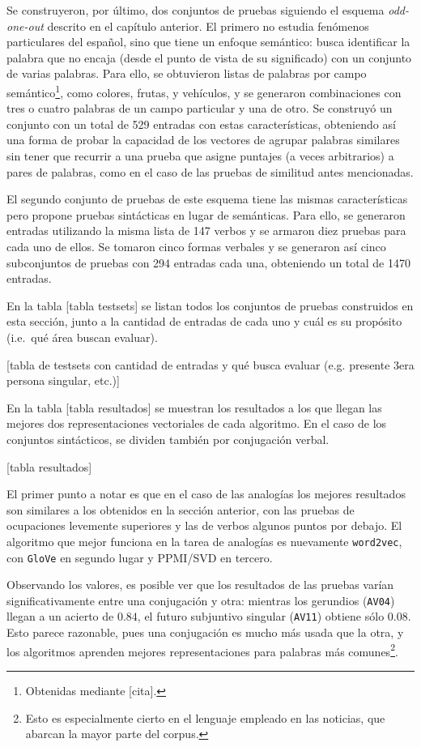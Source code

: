 Se construyeron, por último, dos conjuntos de pruebas siguiendo el esquema \textit{odd-one-out}
descrito en el capítulo anterior. El primero no estudia fenómenos particulares del español, sino que
tiene un enfoque semántico: busca identificar la palabra que no encaja (desde el punto de vista de
su significado) con un conjunto de varias palabras. Para ello, se obtuvieron listas de palabras por
campo semántico\footnote{Obtenidas mediante [cita].}, como colores, frutas, y vehículos, y se
generaron combinaciones con tres o cuatro palabras de un campo particular y una de otro. Se
construyó un conjunto con un total de 529 entradas con estas características, obteniendo así una
forma de probar la capacidad de los vectores de agrupar palabras similares sin tener que recurrir a
una prueba que asigne puntajes (a veces arbitrarios) a pares de palabras, como en el caso de las
pruebas de similitud antes mencionadas.

El segundo conjunto de pruebas de este esquema tiene las mismas características pero propone pruebas
sintácticas en lugar de semánticas. Para ello, se generaron entradas utilizando la misma lista de
147 verbos y se armaron diez pruebas para cada uno de ellos. Se tomaron cinco formas verbales y se
generaron así cinco subconjuntos de pruebas con 294 entradas cada una, obteniendo un total de 1470
entradas.

En la tabla [tabla testsets] se listan todos los conjuntos de pruebas construidos en esta sección,
junto a la cantidad de entradas de cada uno y cuál es su propósito (i.e.\ qué área buscan evaluar).

[tabla de testsets con cantidad de entradas y qué busca evaluar (e.g. presente 3era persona singular, etc.)]

\quad

En la tabla [tabla resultados] se muestran los resultados a los que llegan las mejores dos
representaciones vectoriales de cada algoritmo. En el caso de los conjuntos sintácticos, se dividen
también por conjugación verbal.

[tabla resultados]

El primer punto a notar es que en el caso de las analogías los mejores resultados son similares a
los obtenidos en la sección anterior, con las pruebas de ocupaciones levemente superiores y las de
verbos algunos puntos por debajo. El algoritmo que mejor funciona en la tarea de analogías es
nuevamente \texttt{word2vec}, con \texttt{GloVe} en segundo lugar y PPMI/SVD en tercero.

Observando los valores, es posible ver que los resultados de las pruebas varían significativamente
entre una conjugación y otra: mientras los gerundios (\texttt{AV04}) llegan a un acierto de $0.84$,
el futuro subjuntivo singular (\texttt{AV11}) obtiene sólo $0.08$. Esto parece razonable, pues una
conjugación es mucho más usada que la otra, y los algoritmos aprenden mejores representaciones para
palabras más comunes\footnote{Esto es especialmente cierto en el lenguaje empleado en las noticias,
que abarcan la mayor parte del corpus.}.

